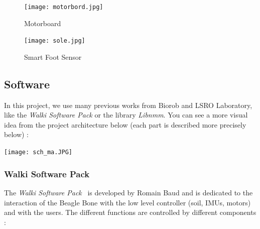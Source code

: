 \documentclass[a4paper,12pt]{article}
\begin{document}
\begin{figure}[H]
\begin{minipage}[c]{.46\linewidth}
     \begin{center}
             \texttt{[image: motorbord.jpg]}
             \caption{Motorboard}
             \label{motorboard}
         \end{center}
   \end{minipage} \hfill
   \begin{minipage}[c]{.46\linewidth}
    \begin{center}
            \texttt{[image: sole.jpg]}
            \caption{Smart Foot Sensor~\cite{soles}}
            \label{sole}
        \end{center}
 \end{minipage}
\end{figure}


\subsection{Software}

In this project, we use many previous works from Biorob and LSRO Laboratory, like the \textit{Walki Software Pack} or the library \textit{Libnmm}. You can see a more visual idea from the project architecture below (each part is described more precisely below) :

\begin{center}
\texttt{[image: sch\_ma.JPG]}
\end{center}

\subsubsection{Walki Software Pack}

The \textit{Walki Software Pack}~\cite{walkisoftwarepack} is developed by Romain Baud and is dedicated to the interaction of the Beagle Bone with the low level controller (soil, IMUs, motors) and with the users. The different functions are controlled by different components : 
\end{document}
